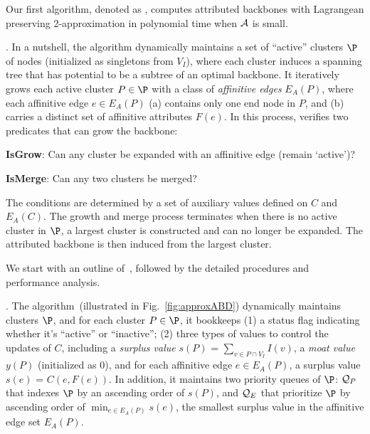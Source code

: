Our first algorithm, denoted as \approxabd,
computes attributed backbones with Lagrangean preserving 2-approximation in polynomial time when $\A$ is small.

. In a nutshell, the algorithm \approxabd
dynamically maintains a set of ``active'' clusters $\P$
of nodes (initialized as singletons from $V_I$), where
each cluster induces a spanning tree that
has potential to be a subtree of an optimal backbone.
It iteratively grows each active cluster $P\in \P$ with
a class of {\em affinitive edges} $E_A(P)$,
where each affinitive edge $e\in E_A(P)$
(a) contains only one end node in $P$, and
(b) carries a
distinct set of affinitive attributes $F(e)$.
In this process, \approxabd verifies two predicates
that can grow the backbone:
\bi
\item \textbf{IsGrow}: Can any cluster be expanded with
an affinitive edge (remain `active')?
\item \textbf{IsMerge}: Can any two clusters be merged?
\ei

The conditions are determined by a set of
auxiliary values defined on $C$ and
$E_A(C)$.
The growth and merge process terminates when there is no
active cluster in $\P$,
\ie a largest cluster is constructed and can no longer be
expanded. The attributed backbone is then induced
from the largest cluster.

\vspace{.5ex}
We start with an outline of~\approxabd, followed by
the detailed procedures and performance analysis.


.
The algorithm~\approxabd (illustrated in Fig.~\ref{fig:approxABD})
dynamically maintains clusters $\P$, and
for each cluster  $P\in \P$,
it bookkeeps
(1) a status flag indicating whether it's
``active'' or ``inactive'';
(2) three types of values to control the updates
of $C$, including a {\em surplus value} $s(P)$ = $\sum_{v\in P\cap V_I}I(v)$, a {\em moat value} $y(P)$ (initialized as $0$), and
for each affinitive edge $e\in E_A(P)$, a surplus value
$s(e)$ = $C(e, F(e))$.
In addition, it maintains two priority queues
of $\P$: $\Q_P$ that indexes $\P$ by an
ascending order of $s(P)$,
and $\Q_E$ that prioritize $\P$ by
ascending order of
$\min_{e\in E_A(P)}s(e)$, \ie
the smallest surplus value in the
affinitive edge set $E_A(P)$.

